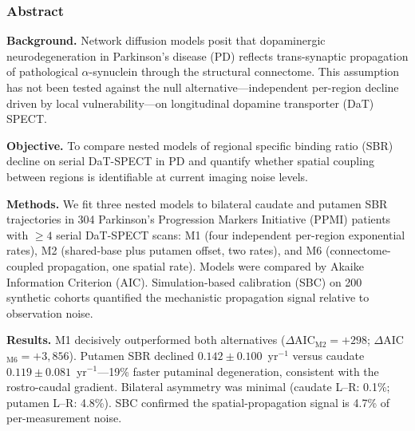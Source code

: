 

\subsubsection*{Abstract}

\noindent\textbf{Background.}
Network diffusion models posit that dopaminergic neurodegeneration in Parkinson's disease (PD) reflects trans-synaptic propagation of pathological $\alpha$-synuclein through the structural connectome. This assumption has not been tested against the null alternative---independent per-region decline driven by local vulnerability---on longitudinal dopamine transporter (DaT) SPECT.

\noindent\textbf{Objective.}
To compare nested models of regional specific binding ratio (SBR) decline on serial DaT-SPECT in PD and quantify whether spatial coupling between regions is identifiable at current imaging noise levels.

\noindent\textbf{Methods.}
We fit three nested models to bilateral caudate and putamen SBR trajectories in 304 Parkinson's Progression Markers Initiative (PPMI) patients with $\geq 4$ serial DaT-SPECT scans: M1 (four independent per-region exponential rates), M2 (shared-base plus putamen offset, two rates), and M6 (connectome-coupled propagation, one spatial rate). Models were compared by Akaike Information Criterion (AIC). Simulation-based calibration (SBC) on 200 synthetic cohorts quantified the mechanistic propagation signal relative to observation noise.

\noindent\textbf{Results.}
M1 decisively outperformed both alternatives ($\Delta$AIC$_{\mathrm{M2}} = +298$; $\Delta$AIC$_{\mathrm{M6}} = +3{,}856$). Putamen SBR declined $0.142 \pm 0.100$~yr$^{-1}$ versus caudate $0.119 \pm 0.081$~yr$^{-1}$---19\% faster putaminal degeneration, consistent with the rostro-caudal gradient. Bilateral asymmetry was minimal (caudate L--R: 0.1\%; putamen L--R: 4.8\%). SBC confirmed the spatial-propagation signal is 4.7\% of per-measurement noise.

